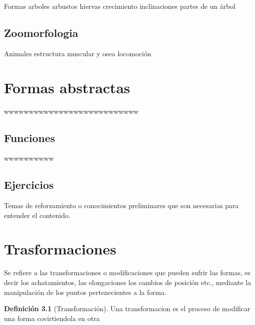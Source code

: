\documentclass[16pt,]{krantz}
\theoremstyle{definition}
\newtheorem{definition}{Definición}[chapter]
\theoremstyle{definition}
\theoremstyle{definition}
\theoremstyle{definition}
\theoremstyle{remark}
\begin{document}
Formas arboles arbustos hiervas crecimiento inclinaciones partes de un árbol

\hypertarget{zoomorfologia}{%
\section{Zoomorfologia}\label{zoomorfologia}}

Animales estructura muscular y osea locomoción

\hypertarget{formas-abstractas}{%
\chapter{Formas abstractas}\label{formas-abstractas}}

wwwwwwwwwwwwwwwwwwwwwwwwwww

\hypertarget{funciones}{%
\section{Funciones}\label{funciones}}

wwwwwwwwww \citep{vincze2014college}

\hypertarget{ejercicios}{%
\section{Ejercicios}\label{ejercicios}}

\hypertarget{appendix-apendice}{%
\appendix {}}


Temas de reforzamiento o conocimientos preliminares que son necesarias para entender el contenido.

\hypertarget{trasformaciones}{%
\chapter{Trasformaciones}\label{trasformaciones}}

Se refiere a las transformaciones o modificaciones que pueden sufrir las formas, es decir los achatamientos, las elongaciones los cambios de posición etc., mediante la manipulación de los puntos pertenecientes a la forma.

\begin{definition}[Transformación]
\protect\hypertarget{def:transformacion}{}{\label{def:transformacion} {} }Una transformacion es el proceso de modificar una forma covirtiendola en otra
\end{definition}
\end{document}
